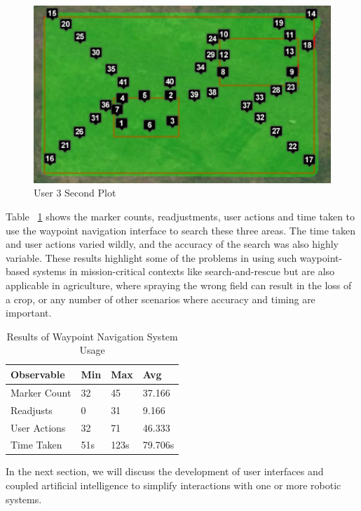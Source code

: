 \documentclass{sig-alternate-ipsn13}
\newcommand\T{\rule{0pt}{2.6ex}}
\newcommand\B{\rule[-1.2ex]{0pt}{0pt}}
\begin{document}
\begin{figure}[h]
  \centering
  \includegraphics[scale=0.45]{user_waypoints_6}
  \caption{User 3 Second Plot}
  \label{fig:user3_2}
\end{figure}

Table ~\ref{tab:averagewaypoints} shows the marker counts, readjustments,
user actions and time taken to use the waypoint navigation interface to search these
three areas. The time taken and user actions varied wildly, and the accuracy of the
search was also highly variable. These results highlight some of the problems in
using such waypoint-based systems in mission-critical contexts like
search-and-rescue but are also applicable in agriculture, where spraying the wrong
field can result in the loss of a crop, or any number of other scenarios where
accuracy and timing are important.

\begin{table}[htb]
\caption{Results of Waypoint Navigation System Usage}
\label{tab:averagewaypoints}
\centering
\begin{tabular}{|l|l|l|l|}
\hline

Observable \T & Min & Max & Avg \\
\hline Marker Count \T & 32 & 45 & 37.166 \\ 
Readjusts & 0 & 31 & 9.166 \\ 
User Actions & 32 & 71 & 46.333 \\ 
Time Taken \B & 51s  & 123s & 79.706s \\ \hline
\end{tabular}
\end{table}

In the next section, we will discuss the development of user interfaces and
coupled artificial intelligence to simplify interactions with one or more robotic
systems.

\end{document}
